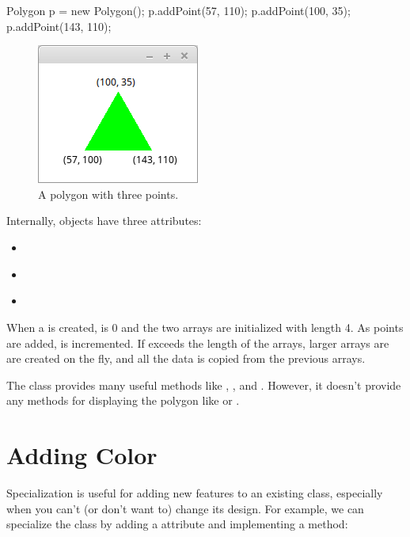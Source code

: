 \begin{code}
Polygon p = new Polygon();
p.addPoint(57, 110);
p.addPoint(100, 35);
p.addPoint(143, 110);
\end{code}

\begin{figure}[!ht]
\begin{center}
\includegraphics[scale=1]{figs/triangle.png}
\caption{A polygon with three points.}
\label{fig:triangle}
\end{center}
\end{figure}

Internally,  objects have three attributes:

\begin{itemize}
\item {} {\tt ~~~} 
\item {} {\tt ~} 
\item {} {\tt ~} 
\end{itemize}

When a  is created,  is 0 and the two arrays are initialized with length 4.
As points are added,  is incremented.
If  exceeds the length of the arrays, larger arrays are are created on the fly, and all the data is copied from the previous arrays.

The  class provides many useful methods like , , and .
However, it doesn't provide any methods for displaying the polygon like  or .


\section{Adding Color}

Specialization is useful for adding new features to an existing class, especially when you can't (or don't want to) change its design.
For example, we can specialize the  class by adding a  attribute and implementing a  method:

